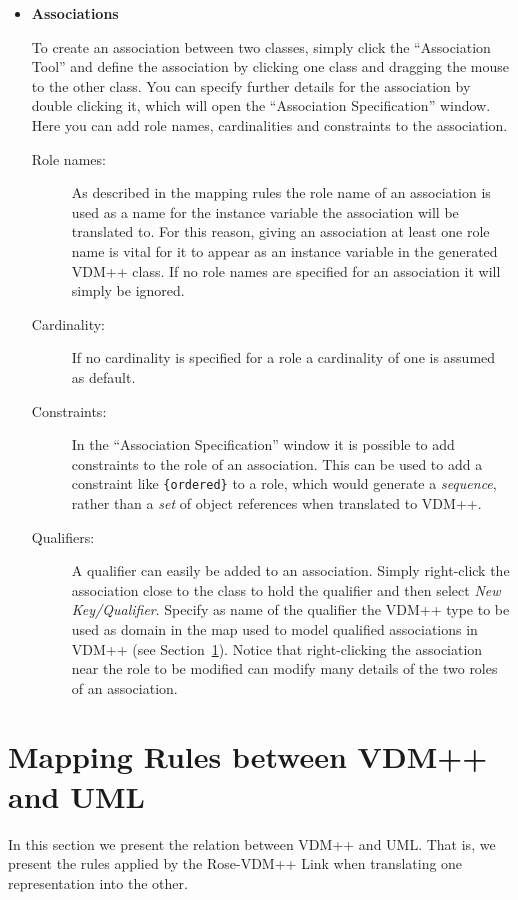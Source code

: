 \documentclass[\pformat,12pt]{article}
\newcommand{\vdmpp}{VDM++}
\newcommand{\link}{Rose-\vdmpp{} Link}
\begin{document}
\begin{itemize}
\item{\bf Associations}
  
To create an association between two classes, simply click the ``Association Tool'' and   
define the association by clicking one class and dragging the mouse to the other class.   
You can specify further details for the association by double clicking it, which will open   
the ``Association Specification'' window. Here you can add role names, cardinalities and   
constraints to the association.  


\begin{description}
\item [Role names:] As described in the mapping rules the role name of an association is used as   
a name for the instance variable the association will be translated to. For this reason,   
giving an association at least one role name is vital for it to appear as an instance   
variable in the generated \vdmpp{} class. If no role names are specified for an association it   
will simply be ignored.  
\item [Cardinality:] If no cardinality is specified for a role a cardinality of one is assumed as   
default.  
\item [Constraints:] In the ``Association Specification'' window it is
  possible to add constraints to the role of an association. This
  can be used to add a constraint like {\tt \{ordered\}} to a role,
  which would generate a {\it sequence}, rather than a {\it set} of
  object references when translated to \vdmpp{}.
\item [Qualifiers:] A qualifier can easily be added to an association.
  Simply right-click the association close to the class to hold the
  qualifier and then select {\em New Key/Qualifier}. Specify as name of
  the qualifier the \vdmpp{} type to be used as domain in the map used
  to model qualified associations in \vdmpp{} (see
  Section~\ref{mapping}).  Notice that right-clicking the association
  near the role to be modified can modify many details of the two
  roles of an association.
\end{description}  
\end{itemize}
  
\newpage  
\section{Mapping Rules between VDM++ and UML}
\label{mapping}
  
In this section we present the relation between \vdmpp{} and UML. That is, we present the   
rules applied by the \link{} when translating one representation into the other.  
\end{document}
